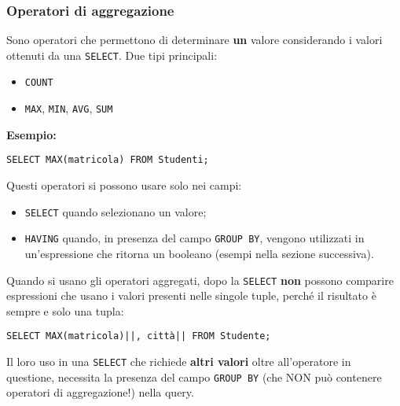 \documentclass[a4paper, 10pt, titlepage]{article}
\begin{document}
	\subsubsection{Operatori di aggregazione}
		Sono operatori che permettono di determinare \textbf{un} valore considerando i
		valori ottenuti da una \lstinline|SELECT|.
		Due tipi principali:
		\begin{itemize}
			\item \lstinline|COUNT|
			\item \lstinline|MAX|, \lstinline|MIN|, \lstinline|AVG|, \lstinline|SUM|
		\end{itemize}
\textbf{Esempio: }
		\begin{lstlisting}
SELECT MAX(matricola) FROM Studenti;
		\end{lstlisting}		
		Questi operatori si possono usare solo nei campi:
		\begin{itemize}
		\item \lstinline|SELECT| quando selezionano un valore;
		\item \lstinline|HAVING| quando, in presenza del campo \lstinline|GROUP BY|, vengono utilizzati in un'espressione che ritorna un booleano (esempi nella sezione successiva).
		\end{itemize} 
		Quando si usano gli operatori aggregati, dopo la \lstinline|SELECT| \textbf{non} possono
		comparire espressioni che usano i valori presenti nelle singole tuple, perché il risultato è sempre e solo una tupla:
		\begin{lstlisting}
SELECT MAX(matricola)||, città|| FROM Studente;
		\end{lstlisting}
		Il loro uso in una \lstinline|SELECT| che richiede \textbf{altri valori} oltre all'operatore in questione, necessita la presenza del campo \lstinline|GROUP BY| (che NON può contenere operatori di aggregazione!) nella query. 
\end{document}
